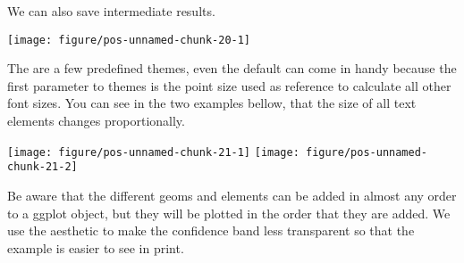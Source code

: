 \documentclass[paper=a4,10pt,div=17,headsepline,BCOR=12mm,twoside,open=right]{scrbook}\usepackage{knitr}
\begin{document}
We can also save intermediate results.

\begin{knitrout}\footnotesize
{}\color{fgcolor}\begin{kframe}
\begin{alltt}
 \hlkwb{<-}  \hlopt{+} \hlstd{(}\hlstd{=}\hlstd{(}\hlstd{,}\hlstd{,}\hlstd{),} \hlstd{=}\hlstd{(}\hlstd{,}\hlstd{))}
 \hlopt{+}  \hlopt{+} \hlstd{()}
\end{alltt}
\end{kframe}

{\centering \texttt{[image: figure/pos-unnamed-chunk-20-1]} 

}



\end{knitrout}

The are a few predefined themes, even the default  can come in handy because the first parameter to themes is the point size used as reference to calculate all other font sizes. You can see in the two examples bellow, that the size of all text elements changes proportionally.

\begin{knitrout}\footnotesize
{}\color{fgcolor}\begin{kframe}
\begin{alltt}
 \hlopt{+}  \hlopt{+} \hlstd{(}\hlstd{)}
 \hlopt{+}  \hlopt{+} \hlstd{(}\hlstd{)}
\end{alltt}
\end{kframe}

{\centering \texttt{[image: figure/pos-unnamed-chunk-21-1]} 
\texttt{[image: figure/pos-unnamed-chunk-21-2]} 

}



\end{knitrout}

Be aware that the different geoms and elements can be added in almost any order to a ggplot object, but they will be plotted in the order that they are added. We use the  aesthetic to make the confidence band less transparent so that the example is easier to see in print.
\end{document}
